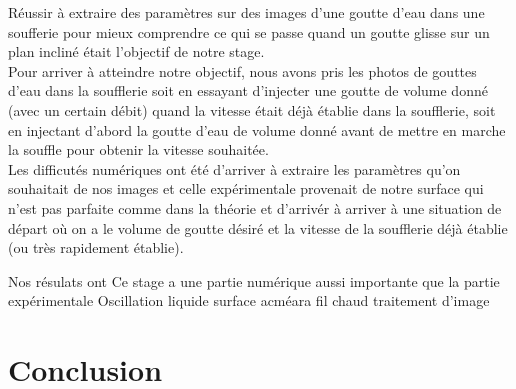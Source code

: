 \documentclass[french]{article}
\begin{document}
Réussir à extraire des paramètres sur des images d'une goutte d'eau dans une soufferie pour mieux comprendre ce qui se passe quand un goutte glisse sur un plan incliné était l'objectif de notre stage.\\


Pour arriver à atteindre notre objectif, nous avons pris les photos de gouttes d'eau dans la soufflerie soit en essayant d'injecter une goutte de volume donné (avec un certain débit) quand la vitesse était déjà établie dans la soufflerie, soit en injectant d'abord la goutte d'eau de volume donné avant de mettre en marche la souffle pour obtenir la vitesse souhaitée.\\

Les difficutés numériques ont été d'arriver à extraire les paramètres qu'on souhaitait de nos images et celle expérimentale provenait de notre surface qui n'est pas parfaite comme dans la théorie et d'arrivér à arriver à une situation de départ où on a le volume de goutte désiré et la vitesse de la soufflerie déjà établie (ou très rapidement établie).

Nos résulats ont
Ce stage a une partie numérique aussi importante que la partie expérimentale
Oscillation
liquide
surface
acméara
fil chaud
traitement d'image

\section{Conclusion}
\end{document}
